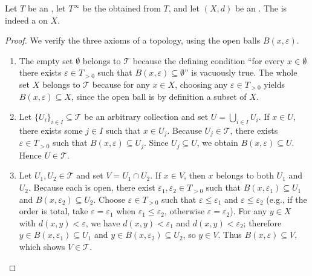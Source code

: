 \begin{proposition} \label{proposition:induced_topology_of_an_extended_metric_valued_in_an_ordered_commutative_monoid_with_adjoined_infinity_is_a_topology}
    Let $T$ be an , let $T^\infty$ be the  obtained from $T$, and let $(X,d)$ be an . The  is indeed a  on $X$.
\end{proposition}
\begin{proof}
    We verify the three axioms of a topology, using the open balls $B(x,\varepsilon)$.
    \begin{enumerate}
        \item The empty set $\emptyset$ belongs to $\mathcal{T}$ because the defining condition ``for every $x \in \emptyset$ there exists $\varepsilon \in T_{>0}$ such that $B(x,\varepsilon) \subseteq \emptyset$'' is vacuously true. The whole set $X$ belongs to $\mathcal{T}$ because for any $x \in X$, choosing any $\varepsilon \in T_{>0}$ yields $B(x,\varepsilon) \subseteq X$, since the open ball is by definition a subset of $X$.

        \item Let $\{U_i\}_{i \in I} \subseteq \mathcal{T}$ be an arbitrary collection and set $U = \bigcup_{i \in I} U_i$. If $x \in U$, there exists some $j \in I$ such that $x \in U_j$. Because $U_j \in \mathcal{T}$, there exists $\varepsilon \in T_{>0}$ such that $B(x,\varepsilon) \subseteq U_j$. Since $U_j \subseteq U$, we obtain $B(x,\varepsilon) \subseteq U$. Hence $U \in \mathcal{T}$.

        \item Let $U_1, U_2 \in \mathcal{T}$ and set $V = U_1 \cap U_2$. If $x \in V$, then $x$ belongs to both $U_1$ and $U_2$. Because each is open, there exist $\varepsilon_1, \varepsilon_2 \in T_{>0}$ such that $B(x,\varepsilon_1) \subseteq U_1$ and $B(x,\varepsilon_2) \subseteq U_2$. Choose $\varepsilon \in T_{>0}$ such that $\varepsilon \leq \varepsilon_1$ and $\varepsilon \leq \varepsilon_2$ (e.g., if the order is total, take $\varepsilon = \varepsilon_1$ when $\varepsilon_1 \leq \varepsilon_2$, otherwise $\varepsilon = \varepsilon_2$). For any $y \in X$ with $d(x,y) < \varepsilon$, we have $d(x,y) < \varepsilon_1$ and $d(x,y) < \varepsilon_2$; therefore $y \in B(x,\varepsilon_1) \subseteq U_1$ and $y \in B(x,\varepsilon_2) \subseteq U_2$, so $y \in V$. Thus $B(x,\varepsilon) \subseteq V$, which shows $V \in \mathcal{T}$.
    \end{enumerate}

\end{proof}
